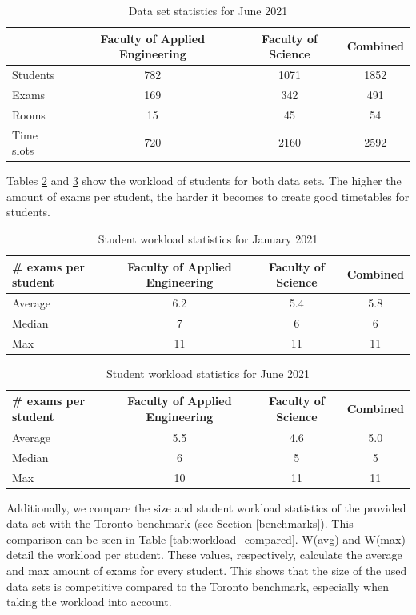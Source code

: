 \begin{table}[H]
	\caption{Data set statistics for June 2021}
	\label{tab:data_set_sem2}
	\centering
	\begin{tabular}{l c c c }
		\hline
		& \textbf{Faculty of Applied Engineering} & \textbf{Faculty of Science} & \textbf{Combined} \\ \hline
		Students & 782 & 1071 & 1852 \\
		Exams & 169 & 342 & 491 \\
	    Rooms & 15 & 45 & 54 \\
        Time slots & 720 & 2160 & 2592 \\ \hline
	\end{tabular}
\end{table}

Tables \ref{tab:workload_sem1} and \ref{tab:workload_sem2} show the workload of students for both data sets. The higher the amount of exams per student, the harder it becomes to create good timetables for students. 


\begin{table}[H]
	\caption{Student workload statistics for January 2021}
	\label{tab:workload_sem1}
	\centering
	\begin{tabular}{l c c c }
		\hline
		\textbf{\# exams per student}& \textbf{Faculty of Applied Engineering} & \textbf{Faculty of Science} & \textbf{Combined} \\ \hline
		Average  & 6.2 & 5.4 & 5.8 \\
		Median & 7 & 6 & 6 \\
	    Max & 11 & 11 & 11 \\
	\end{tabular}
\end{table}

\begin{table}[H]
	\caption{Student workload statistics for June 2021}
	\label{tab:workload_sem2}
	\centering
	\begin{tabular}{l c c c }
		\hline
		\textbf{\# exams per student}& \textbf{Faculty of Applied Engineering} & \textbf{Faculty of Science} & \textbf{Combined} \\ \hline
		Average  & 5.5 & 4.6 & 5.0 \\
		Median & 6 & 5 & 5 \\
	    Max & 10 & 11 & 11 \\
	\end{tabular}
\end{table}

Additionally, we compare the size and student workload statistics of the provided data set with the Toronto benchmark \cite{ceschia2022} (see Section \ref{benchmarks}). This comparison can be seen in Table \ref{tab:workload_compared}. W(avg) and W(max) detail the workload per student. These values, respectively, calculate the average and max amount of exams for every student. This shows that the size of the used data sets is competitive compared to the Toronto benchmark, especially when taking the workload into account.

